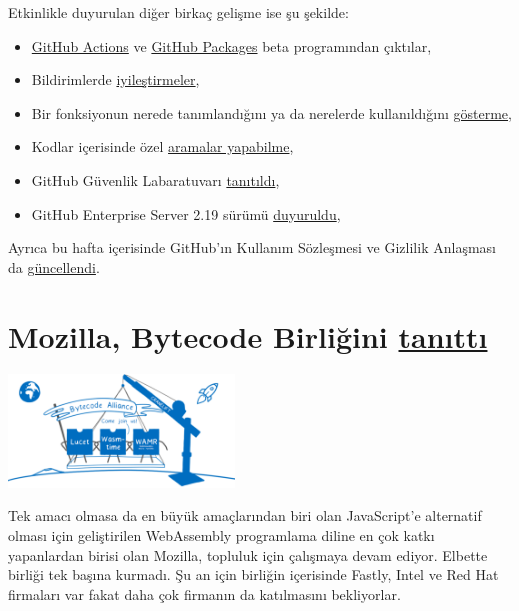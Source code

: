 \documentclass[11pt]{article}
\begin{document}
Etkinlikle duyurulan diğer birkaç gelişme ise şu şekilde:
\begin{itemize}
\item \href{https://github.blog/2019-11-13-universe-day-one/\#github-actions}{GitHub Actions} ve \href{https://github.blog/2019-11-13-universe-day-one/\#github-packages}{GitHub Packages} beta programından çıktılar,
\item Bildirimlerde \href{https://github.blog/2019-11-13-universe-day-one/\#notifications}{iyileştirmeler},
\item Bir fonksiyonun nerede tanımlandığını ya da nerelerde kullanıldığını
\href{https://github.blog/2019-11-13-universe-day-one/\#navigation}{gösterme},
\item Kodlar içerisinde özel \href{https://github.blog/2019-11-13-universe-day-one/\#search}{aramalar yapabilme},
\item GitHub Güvenlik Labaratuvarı \href{https://github.blog/2019-11-14-announcing-github-security-lab-securing-the-worlds-code-together/}{tanıtıldı},
\item GitHub Enterprise Server 2.19 sürümü \href{https://github.blog/2019-11-13-universe-day-one/\#server}{duyuruldu},
\end{itemize}
Ayrıca bu hafta içerisinde GitHub'ın Kullanım Sözleşmesi ve Gizlilik Anlaşması
da \href{https://github.blog/2019-11-15-updates-to-our-terms-of-service-and-privacy-statement/}{güncellendi}.
\section{Mozilla, Bytecode Birliğini \href{https://hacks.mozilla.org/2019/11/announcing-the-bytecode-alliance/}{tanıttı}}
\label{sec:org4d8b700}
\begin{center}
\includegraphics[height=3cm]{gorseller/mozilla-bytecode-alliance.png}
\end{center}

Tek amacı olmasa da en büyük amaçlarından biri olan JavaScript'e alternatif
olması için geliştirilen WebAssembly programlama diline en çok katkı
yapanlardan birisi olan Mozilla, topluluk için çalışmaya devam ediyor. Elbette
birliği tek başına kurmadı. Şu an için birliğin içerisinde Fastly, Intel ve Red
Hat firmaları var fakat daha çok firmanın da katılmasını bekliyorlar.
\end{document}
